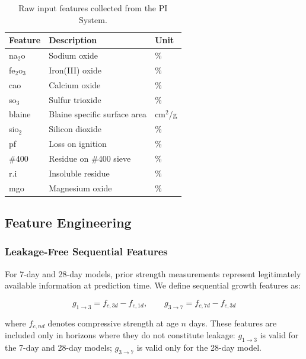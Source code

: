 \documentclass[preprint,12pt]{elsarticle}
\begin{document}
\begin{table}[H]
\centering
\caption{Raw input features collected from the PI System.}
\label{tab:features}
\begin{tabular}{lll}
\toprule
Feature     & Description                       & Unit \\
\midrule
na$_2$o     & Sodium oxide                      & \%   \\
fe$_2$o$_3$ & Iron(III) oxide                   & \%   \\
cao         & Calcium oxide                     & \%   \\
so$_3$      & Sulfur trioxide                   & \%   \\
blaine      & Blaine specific surface area      & cm$^2$/g \\
sio$_2$     & Silicon dioxide                   & \%   \\
pf          & Loss on ignition                  & \%   \\
\#400       & Residue on \#400 sieve            & \%   \\
r.i         & Insoluble residue                 & \%   \\
mgo         & Magnesium oxide                   & \%   \\
\bottomrule
\end{tabular}
\end{table}

\subsection{Feature Engineering}
\label{sec:features}

\subsubsection{Leakage-Free Sequential Features}

For 7-day and 28-day models, prior strength measurements represent legitimately
available information at prediction time.
We define sequential growth features as:

\begin{equation}
  g_{1\to3} = f_{c,3d} - f_{c,1d}, \qquad g_{3\to7} = f_{c,7d} - f_{c,3d}
\end{equation}

\noindent where $f_{c,nd}$ denotes compressive strength at age $n$ days.
These features are included only in horizons where they do not constitute
leakage: $g_{1\to3}$ is valid for the 7-day and 28-day models;
$g_{3\to7}$ is valid only for the 28-day model.
\end{document}

